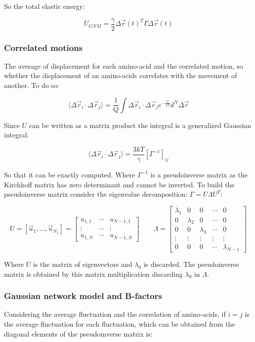 	So the total elastic energy:

	$$U_{GNM} = \frac{\gamma}{2}\Delta\vec{r}(t)^T\Gamma\Delta\vec{r}(t)$$

		\subsubsection{Correlated motions}
		The average of displacement for each amino-acid and the correlated motion, so whether the displacement of an amino-acids correlates with the movement of another.
		To do so:

		$$\langle\Delta\vec{r}_i\cdot\Delta\vec{r}_j\rangle = \frac{1}{Q}\int\Delta\vec{r}_i\cdot\Delta\vec{r}_je^{-\frac{U}{kT}}d^N\Delta\vec{r}$$

		Since $U$ can be written as a matrix product the integral is a generalized Gaussian integral:

		$$\langle\Delta\vec{r}_i\cdot\Delta\vec{r}_j\rangle = \frac{3kT}{\gamma}[\Gamma^{-1}]_{ij}$$

		So that it can be exactly computed.
		Where $\Gamma^{-1}$ is a pseudoinverse matrix as the Kirchhoff matrix has zero determinant and cannot be inverted.
		To build the pseudoinverse matrix consider the eigenvalue decomposition: $\Gamma = U\Lambda U^T$:

		$$U = [\vec{u}_1, \dots, \vec{u}_{N_1}] = \begin{bmatrix} u_{1,1} & \cdots & u_{N-1,1}\\\vdots & \cdots & \vdots\\ u_{1, N} & \cdots & u_{N-1, N}\end{bmatrix}\qquad\Lambda = \begin{bmatrix} \lambda_1 & 0 & 0 & \cdots & 0\\ 0 & \lambda_2 & 0 &\cdots & 0\\0 & 0& \lambda_3 & \cdots & 0\\\vdots & \vdots & \vdots & \vdots &\vdots\\ 0 & 0 & 0 & \cdots & \lambda_{N-1}\end{bmatrix}$$

		Where $U$ is the matrix of eigenvectors and $\lambda_0$ is discarded.
		The pseudoinverse matrix is obtained by this matrix multiplication discarding $\lambda_0$ in $\Lambda$.

		\subsubsection{Gaussian network model and B-factors}
		Considering the average fluctuation and the correlation of amino-acids, if $i=j$ is the average fluctuation for each fluctuation, which can be obtained from the diagonal elements of the pseudoinverse matrix is:

